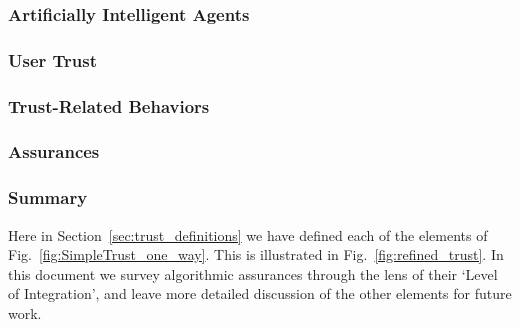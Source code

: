 \subsubsection*{Artificially Intelligent Agents} %

\subsubsection*{User Trust} %

\subsubsection*{Trust-Related Behaviors} %

\subsubsection*{Assurances} \label{sec:assurances}


\subsubsection*{Summary}
Here in Section~\ref{sec:trust_definitions} we have defined each of the elements of Fig.~\ref{fig:SimpleTrust_one_way}. This is illustrated in Fig.~\ref{fig:refined_trust}. In this document we survey algorithmic assurances through the lens of their `Level of Integration', and leave more detailed discussion of the other elements for future work.
